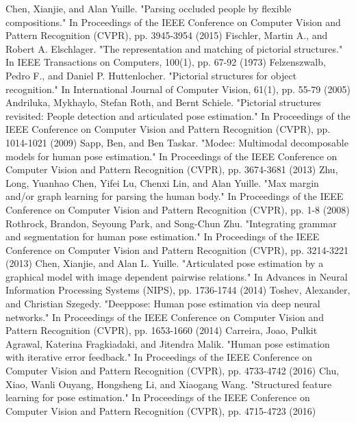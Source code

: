 \begin{thebibliography}{}
Chen, Xianjie, and Alan Yuille. "Parsing occluded people by flexible compositions." In Proceedings of the IEEE Conference on Computer Vision and Pattern Recognition (CVPR), pp. 3945-3954 (2015)
Fischler, Martin A., and Robert A. Elschlager. "The representation and matching of pictorial structures." In IEEE Transactions on Computers, 100(1), pp. 67-92 (1973)
Felzenszwalb, Pedro F., and Daniel P. Huttenlocher. "Pictorial structures for object recognition." In International Journal of Computer Vision, 61(1), pp. 55-79 (2005)
Andriluka, Mykhaylo, Stefan Roth, and Bernt Schiele. "Pictorial structures revisited: People detection and articulated pose estimation." In Proceedings of the IEEE Conference on Computer Vision and Pattern Recognition (CVPR), pp. 1014-1021 (2009)
Sapp, Ben, and Ben Taskar. "Modec: Multimodal decomposable models for human pose estimation." In Proceedings of the IEEE Conference on Computer Vision and Pattern Recognition (CVPR), pp. 3674-3681 (2013)
Zhu, Long, Yuanhao Chen, Yifei Lu, Chenxi Lin, and Alan Yuille. "Max margin and/or graph learning for parsing the human body." In Proceedings of the IEEE Conference on Computer Vision and Pattern Recognition (CVPR), pp. 1-8 (2008)
Rothrock, Brandon, Seyoung Park, and Song-Chun Zhu. "Integrating grammar and segmentation for human pose estimation." In Proceedings of the IEEE Conference on Computer Vision and Pattern Recognition (CVPR), pp. 3214-3221 (2013)
Chen, Xianjie, and Alan L. Yuille. "Articulated pose estimation by a graphical model with image dependent pairwise relations." In Advances in Neural Information Processing Systems (NIPS), pp. 1736-1744 (2014)
Toshev, Alexander, and Christian Szegedy. "Deeppose: Human pose estimation via deep neural networks." In Proceedings of the IEEE Conference on Computer Vision and Pattern Recognition (CVPR), pp. 1653-1660 (2014)
Carreira, Joao, Pulkit Agrawal, Katerina Fragkiadaki, and Jitendra Malik. "Human pose estimation with iterative error feedback." In Proceedings of the IEEE Conference on Computer Vision and Pattern Recognition (CVPR), pp. 4733-4742 (2016)
Chu, Xiao, Wanli Ouyang, Hongsheng Li, and Xiaogang Wang. "Structured feature learning for pose estimation." In Proceedings of the IEEE Conference on Computer Vision and Pattern Recognition (CVPR), pp. 4715-4723 (2016)

\end{thebibliography}
